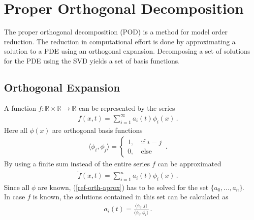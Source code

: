 \section{Proper Orthogonal Decomposition} \label{chap-pod}
The proper orthogonal decomposition (POD) is a method for model order reduction.
The reduction in computational effort is done by approximating a solution to a PDE using an orthogonal expansion.
Decomposing a set of solutions for the PDE using the SVD yields a set of basis functions.
\subsection{Orthogonal Expansion}
A function \(f: \mathbb{R} \times \mathbb{R} \rightarrow \mathbb{R}\) can be represented by the series
\begin{gather}
f(x, t) = \sum_{i = 1}^{\infty}a_i(t)\phi_i(x) \label{ref-orth-exp} \,.
\end{gather}
Here all \(\phi(x)\) are orthogonal basis functions
\begin{gather}
\langle\phi_i, \phi_j\rangle =\begin{cases}
1, \quad \text{if } i = j \\
0, \quad \text{else}
\end{cases} \,. \label{phi-orth}
\end{gather}
By using a finite sum instead of the entire  series \(f\) can be approximated
\begin{gather}
\tilde{f}(x, t) = \sum_{i = 1}^{n}a_{i}(t)\phi_{i}(x) \,. \label{ref-orth-aprox}
\end{gather}
Since all \(\phi\) are known, (\ref{ref-orth-aprox}) has to be solved for the set \(\{a_0, ..., a_n\}\).
In case \(f\) is known, the solutions contained in this set can be calculated as
\begin{gather}
a_i(t) = \frac{\langle \phi_i, f \rangle}{\langle \phi_i, \phi_i \rangle} \,. \label{sol-ai}
\end{gather}
\cite{Gustafsson2011e}
